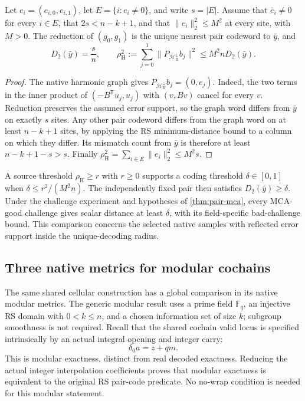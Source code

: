 \begin{samepage}
\begin{proposition}
\label{prop:restricted-hodge-rs}
Let \(e_i=(e_{i,0},e_{i,1})\), let \(E=\{i:e_i\ne0\}\), and write
\(s=|E|\). Assume that \(\bar e_i\ne0\) for every \(i\in E\), that
\(2s<n-k+1\), and that \(\|e_i\|_2^2\le M^2\) at every site, with \(M>0\).
The reduction of \((g_0,g_1)\) is the unique nearest pair codeword to
\(\bar y\), and
\[
  D_2(\bar y)=\frac{s}{n},\qquad
  \rho_{\mathrm H}^2
  := \sum_{j=0}^1 \|P_{\mathcal H_B^\perp}b_j\|^2
  \le M^2 n D_2(\bar y).
\]
\end{proposition}
\end{samepage}

\begin{proof}
The native harmonic graph gives \(P_{\mathcal H_B^\perp}b_j=(0,e_j)\).
Indeed, the two terms in the inner product of
\((-B^{\mathsf T}u_j,u_j)\) with \((v,Bv)\) cancel for every \(v\).
Reduction preserves the assumed error support, so the graph word differs
from \(\bar y\) on exactly \(s\) sites. Any other pair codeword differs
from the graph word on at least \(n-k+1\) sites, by applying the RS
minimum-distance bound to a column on which they differ. Its mismatch
count from \(\bar y\) is therefore at least \(n-k+1-s>s\).
Finally \(\rho_{\mathrm H}^2=\sum_{i\in E}\|e_i\|_2^2\le M^2s\).
\end{proof}

A source threshold \(\rho_{\mathrm H}\ge r\) with \(r\ge0\) supports a
coding threshold \(\delta\in[0,1]\) when
\(\delta\le r^2/(M^2n)\). The independently fixed pair then satisfies
\(D_2(\bar y)\ge\delta\). Under the challenge experiment and hypotheses of
\cref{thm:pair-mca}, every MCA-good challenge gives scalar distance at least
\(\delta\), with its field-specific bad-challenge bound.
This comparison concerns the selected native samples with reflected error
support inside the unique-decoding radius.

\subsection{Three native metrics for modular cochains}

The same shared cellular construction has a global comparison in its native
modular metrics. The generic modular result uses a prime field \(\mathbb F_q\), an
injective RS domain with \(0<k\le n\), and a chosen information set of size
\(k\); subgroup smoothness is not required. Recall that the shared cochain
valid locus is specified intrinsically by an actual integral opening and
integer carry:
\[
 \delta_0a=z+qm.
\]
This is modular exactness, distinct from real decoded exactness. Reducing the
actual integer interpolation coefficients proves that modular exactness is
equivalent to the original RS pair-code predicate. No no-wrap condition is
needed for this modular statement.

